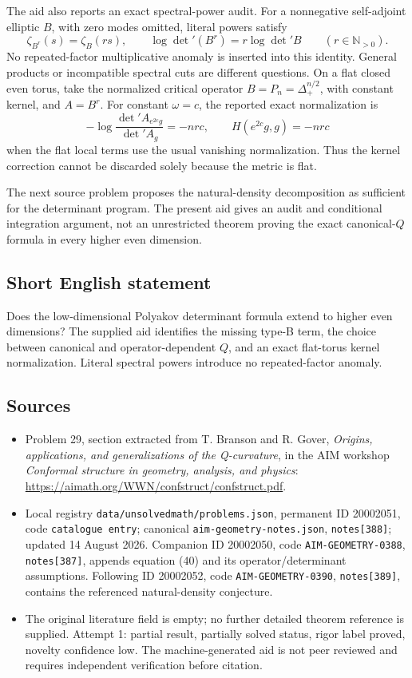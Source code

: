 \documentclass[11pt]{article}
\newcommand{\N}{\mathbb{N}}
\begin{document}
The aid also reports an exact spectral-power audit. For a nonnegative self-adjoint elliptic \(B\), with zero modes omitted, literal powers satisfy
\[
\zeta_{B^r}(s)=\zeta_B(rs),\qquad
\log\det'(B^r)=r\log\det'B\qquad(r\in\N_{>0}).
\]
No repeated-factor multiplicative anomaly is inserted into this identity. General products or incompatible spectral cuts are different questions. On a flat closed even torus, take the normalized critical operator \(B=P_n=\Delta_+^{n/2}\), with constant kernel, and \(A=B^r\). For constant \(\omega=c\), the reported exact normalization is
\[
-\log\frac{\det' A_{e^{2c}g}}{\det' A_g}=-nrc,
\qquad H(e^{2c}g,g)=-nrc
\]
when the flat local terms use the usual vanishing normalization. Thus the kernel correction cannot be discarded solely because the metric is flat.

The next source problem proposes the natural-density decomposition as sufficient for the determinant program. The present aid gives an audit and conditional integration argument, not an unrestricted theorem proving the exact canonical-\(Q\) formula in every higher even dimension.
\subsection{Short English statement}
Does the low-dimensional Polyakov determinant formula extend to higher even dimensions? The supplied aid identifies the missing type-B term, the choice between canonical and operator-dependent \(Q\), and an exact flat-torus kernel normalization. Literal spectral powers introduce no repeated-factor anomaly.
\subsection{Sources}
\begin{itemize}
\item Problem 29, section extracted from T. Branson and R. Gover, \emph{Origins, applications, and generalizations of the Q-curvature}, in the AIM workshop \emph{Conformal structure in geometry, analysis, and physics}: \url{https://aimath.org/WWN/confstruct/confstruct.pdf}.
\item Local registry \texttt{data/unsolvedmath/problems.json}, permanent ID 20002051, code \texttt{catalogue entry}; canonical \texttt{aim-geometry-notes.json}, \texttt{notes[388]}; updated 14 August 2026. Companion ID 20002050, code \texttt{AIM-GEOMETRY-0388}, \texttt{notes[387]}, appends equation (40) and its operator/determinant assumptions. Following ID 20002052, code \texttt{AIM-GEOMETRY-0390}, \texttt{notes[389]}, contains the referenced natural-density conjecture.
\item The original literature field is empty; no further detailed theorem reference is supplied. Attempt 1: partial result, partially solved status, rigor label proved, novelty confidence low. The machine-generated aid is not peer reviewed and requires independent verification before citation.
\end{itemize}
\end{document}
